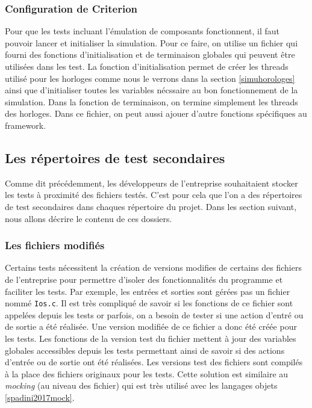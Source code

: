 \documentclass[a4paper]{article}
\begin{document}
\subsubsection*{Configuration de Criterion}
\label{configuration-de-criterion}

Pour que les tests incluant l'émulation de composants fonctionnent, il faut
pouvoir lancer et initialiser la simulation. Pour ce faire, on utilise un
fichier qui fourni des fonctions d'initialisation et de terminaison globales qui
peuvent être utilisées dans les test. La fonction d'initialisation permet de
créer les threads utilisé pour les horloges comme nous le verrons dans la
section \ref{simuhorologes} ainsi que d'initialiser toutes les variables
nécssaire au bon fonctionnement de la simulation. Dans la fonction de
terminaison, on termine simplement les threads des horloges. Dans ce fichier, on
peut aussi ajouer d'autre fonctions spécifiques au framework.

\subsection{Les répertoires de test secondaires}

Comme dit précédemment, les développeurs de l'entreprise souhaitaient stocker
les tests à proximité des fichiers testés. C'est pour cela que l'on a des
répertoires de test secondaires dans chaques répertoire du projet. Dans les
section suivant, nous allons décrire le contenu de ces dossiers.

\subsubsection{Les fichiers modifiés}

Certains tests nécessitent la création de versions modifies de certains des
fichiers de l'entreprise pour permettre d'isoler des fonctionnalités du
programme et faciliter les tests. Par exemple, les entrées et sorties sont
gérées pas un fichier nommé \verb|Ios.c|. Il est très compliqué de savoir si les
fonctions de ce fichier sont appelées depuis les tests or parfois, on a besoin
de tester si une action d'entré ou de sortie a été réalisée. Une version modifiée
de ce fichier a donc été créée pour les tests. Les fonctions de la version test
du fichier mettent à jour des variables globales accessibles depuis les tests
permettant ainsi de savoir si des actions d'entrée ou de sortie ont été
réalisées. Les versions test des fichiers sont compilés à la place des fichiers
originaux pour les tests. Cette solution est similaire au \textit{mocking} (au
niveau des fichier) qui est très utilisé avec les langages objets
\ref{spadini2017mock}.
\end{document}
